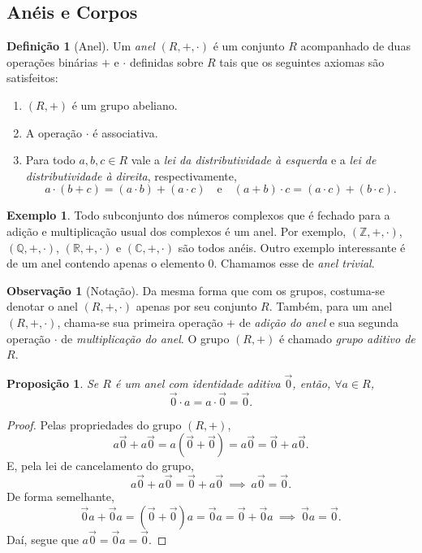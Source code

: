\documentclass[a4paper,12pt]{report}
\theoremstyle{plain}
\newtheorem{proposicao}{Proposição}[section]
\theoremstyle{definition}
\newtheorem{definicao}{Definição}[section]
\newtheorem{observacao}{Observação}[section]
\newtheorem{exemplo}{Exemplo}[section]
\begin{document}



\subsection{Anéis e Corpos}

\begin{definicao}[Anel]
	Um \emph{anel} $(R, +, \cdot)$ é um conjunto $R$ acompanhado de duas operações binárias $+$ e $\cdot$ definidas sobre $R$ tais que os seguintes axiomas são satisfeitos:
	\begin{enumerate}
		\item $(R, +)$ é um grupo abeliano.
		\item A operação $\cdot$ é associativa.
		\item Para todo $a,b,c\in R$ vale a \emph{lei da distributividade à esquerda} e a \emph{lei de distributividade à direita}, respectivamente, $$a\cdot(b+c) = (a\cdot b) + (a\cdot c)\quad \text{e} \quad (a+b)\cdot c = (a\cdot c) + (b\cdot c).$$
	\end{enumerate}
\end{definicao}

\begin{exemplo}
	Todo subconjunto dos números complexos que é fechado para a adição e multiplicação usual dos complexos é um anel. Por exemplo, $(\mathbb{Z}, +, \cdot)$, $(\mathbb{Q}, +, \cdot)$, $(\mathbb{R}, +, \cdot)$ e $(\mathbb{C}, +, \cdot)$ são todos anéis.
	Outro exemplo interessante é de um anel contendo apenas o elemento $0$. Chamamos esse de \emph{anel trivial}.
\end{exemplo}

\begin{observacao}[Notação]
	Da mesma forma que com os grupos, costuma-se denotar o anel $(R, +, \cdot)$ apenas por seu conjunto $R$. Também, para um anel $(R, +, \cdot)$, chama-se sua primeira operação $+$ de \emph{adição do anel} e sua segunda operação $\cdot$ de \emph{multiplicação do anel}. O grupo $(R,+)$ é chamado \emph{grupo aditivo de $R$}.
\end{observacao}

\begin{proposicao}
	Se $R$ é um anel com identidade aditiva $\vec 0$, então, $\forall a \in R$, $$\vec 0 \cdot a = a \cdot \vec 0 = \vec 0.$$
\end{proposicao}
\begin{proof}
	Pelas propriedades do grupo $(R, +)$, $$a\vec 0 + a\vec 0 = a(\vec 0 + \vec 0) = a\vec 0 = \vec 0 + a\vec 0.$$ E, pela lei de cancelamento do grupo, $$a\vec0 + a\vec 0 = \vec 0 + a\vec 0 \ \implies \ a\vec 0 = \vec 0.$$
	De forma semelhante, $$\vec 0a + \vec 0a = (\vec 0 + \vec 0)a = \vec 0a = \vec 0 + \vec 0a \ \implies \ \vec 0a = \vec 0.$$ Daí, segue que $a\vec 0 = \vec 0a = \vec 0$. 
\end{proof}
\end{document}
